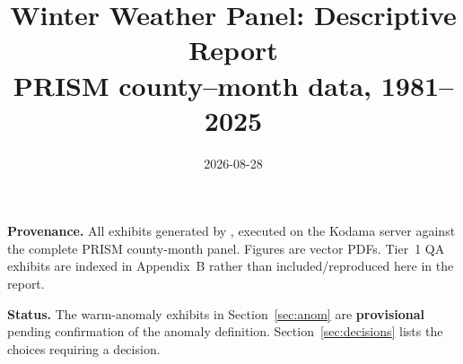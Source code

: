\documentclass[11pt, english, letterpaper]{article}
\begin{document}
\title{Winter Weather Panel: Descriptive Report\\[4pt]
\large PRISM county--month data, 1981--2025}
\date{2026-08-28}
\maketitle
\thispagestyle{empty}
\vspace{-1em}
\begin{center}\begin{minipage}{0.86\textwidth}\small
\textbf{Provenance.} All exhibits generated by
, executed on the Kodama server against the
complete PRISM county-month panel. Figures are vector PDFs. 
Tier~1 QA exhibits are indexed in Appendix~B rather than included/reproduced here in the report.
\par\vspace{6pt}
\textbf{Status.} The warm-anomaly exhibits in Section~\ref{sec:anom} are
\textbf{provisional} pending confirmation of the anomaly definition.
Section~\ref{sec:decisions} lists the choices requiring a decision.
\end{minipage}\end{center}
\newpage
\tableofcontents
\newpage
\end{document}
